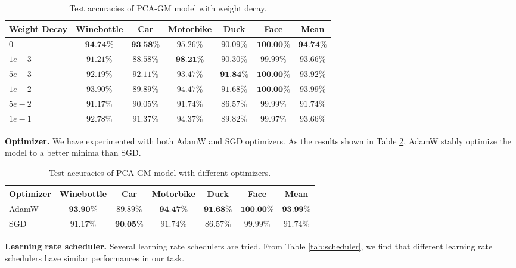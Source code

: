 \documentclass[a4paper]{article}
\begin{document}
\begin{table}[htbp]
    \centering
    \begin{tabular}{lcccccc}
        \toprule
        Weight Decay& Winebottle& Car& Motorbike& Duck& Face& Mean\\
        \midrule
        $0$&$\textbf{94.74\%}$& $\textbf{93.58\%}$& $95.26\%$& $90.09\%$& $\textbf{100.00\%}$& $\textbf{94.74\%}$\\
        $1e-3$& $91.21\%$& $88.58\%$& $\textbf{98.21\%}$& $90.30\%$& $99.99\%$& $93.66\%$\\
        $5e-3$& $92.19\%$& $92.11\%$& $93.47\%$& $\textbf{91.84\%}$& $\textbf{100.00\%}$& $93.92\%$\\
        $1e-2$& $93.90\%$& $89.89\%$& $94.47\%$& $91.68\%$& $\textbf{100.00\%}$& $93.99\%$\\
        $5e-2$& $91.17\%$& $90.05\%$& $91.74\%$& $86.57\%$& $99.99\%$& $91.74\%$\\
        $1e-1$& $92.78\%$& $91.37\%$& $94.37\%$& $89.82\%$& $99.97\%$& $93.66\%$\\
        \bottomrule
        
    \end{tabular}
    \caption{Test accuracies of PCA-GM model with weight decay.}
    \label{tab:weightdecay}
\end{table}

\textbf{Optimizer.}
We have experimented with both AdamW and SGD optimizers. As the results shown in Table \ref{tab:optimizer}, AdamW stably optimize the model to a better minima than SGD. 

\begin{table}[htbp]
    \centering
    \begin{tabular}{lcccccc}
        \toprule
        Optimizer& Winebottle& Car& Motorbike& Duck& Face& Mean\\
        \midrule
        AdamW& $\textbf{93.90\%}$& $89.89\%$& $\textbf{94.47\%}$& $\textbf{91.68\%}$& $\textbf{100.00\%}$& $\textbf{93.99\%}$\\
        SGD& $91.17\%$& $\textbf{90.05\%}$& $91.74\%$& $86.57\%$& $99.99\%$& $91.74\%$\\
        \bottomrule
        
    \end{tabular}
    \caption{Test accuracies of PCA-GM model with different optimizers.}
    \label{tab:optimizer}
\end{table}

\textbf{Learning rate scheduler.}
Several learning rate schedulers are tried. From Table \ref{tab:scheduler}, we find that different learning rate schedulers have similar performances in our task.
\end{document}

